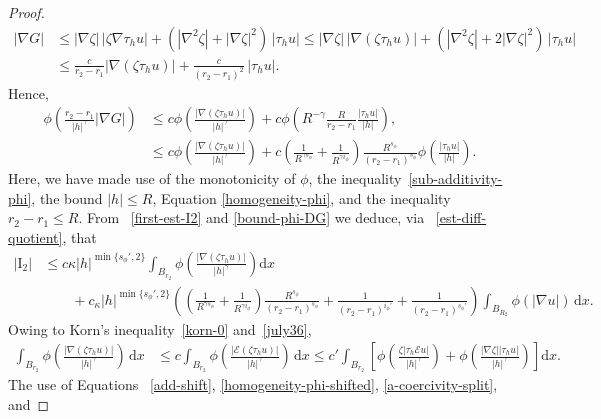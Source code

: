 \documentclass[leqno,11pt]{amsart}%
\numberwithin{equation}{section}
\def\d{\mathrm{d}}
\def\E{\mathcal{E}}
\def\dx{\d x}
\theoremstyle{definition}
\numberwithin{equation}{section}
\begin{document}
\begin{proof}
\begin{align*}
    |\nabla G|
    &\le
      |\nabla\zeta|\,|\zeta \nabla \tau_hu|
      +
      (|\nabla ^2\zeta|+|\nabla\zeta|^2)\,|\tau_hu|\le
      |\nabla\zeta|\,|\nabla(\zeta\tau_hu)|+(|\nabla^2\zeta|+2|\nabla\zeta|^2)\,|\tau_hu|\\
    &\le
    \frac{c}{r_2-r_1}|\nabla(\zeta\tau_hu)|+\frac{c}{(r_2-r_1)^2}\,|\tau_hu|.
\end{align*}
Hence, 
\begin{align}\label{bound-phi-DG}
    \phi\left(\frac{r_2-r_1}{|h|^\gamma}|\nabla G|\right)
    &\le
      c\phi\left(\frac{|\nabla(\zeta\tau_hu)|}{|h|^\gamma}\right)
      +
      c\phi\left( {R^{-\gamma}\frac{R}{r_2-r_1}}\frac{|\tau_hu|}{|h|}\right),\\\nonumber
    &\le
      c\phi\left(\frac{|\nabla (\zeta\tau_hu)|}{|h|^\gamma}\right)
      +
      {c\left(\frac{1}{R^{\gamma s_\phi}}+\frac{1}{R^{\gamma i_\phi}}\right)\frac{R^{s_\phi}}{(r_2-r_1)^{s_\phi}}}\phi\left(\frac{|\tau_hu|}{|h|}\right).
  \end{align}
  Here, we have made use of the monotonicity of $\phi$,
the inequality~\eqref{sub-additivity-phi},  the bound $|h|\le R$, Equation \eqref{homogeneity-phi}, and the inequality
  $r_2-r_1\le R $. From 
 ~\eqref{first-est-I2} and \eqref{bound-phi-DG} we deduce, 
 via ~\eqref{est-diff-quotient}, that
  \begin{align}\label{second-est-I2}
    |\mathrm{I}_2|
    &\le
      c\kappa |h|^{\min\{s_\phi',2\}}\int_{B_{r_2}}
      \phi\left(\frac{|\nabla (\zeta\tau_hu)|}{|h|^\gamma}\right) \dx\\\nonumber
    &\qquad
      +
      c_\kappa |h|^{\min\{s_\phi',2\}}\left( {\left(\frac{1}{R^{\gamma s_\phi}}+\frac{1}{R^{\gamma i_\phi}}\right)\frac{R^{s_\phi}}{(r_2-r_1)^{s_\phi}}}
      +
      \frac{1}{(r_2-r_1)^{i_\phi'}}
      +\frac{1}{(r_2-r_1)^{s_\phi'}}
    \right)\int_{B_{R_2}}\phi(|\nabla u|)
      \,\dx.
  \end{align}
Owing to Korn's
  inequality~\eqref{korn-0} 
  and~\eqref{july36}, 
  \begin{align}\label{bound-higher-deriv}
    \int_{B_{r_2}}
    \phi\left(\frac{|\nabla(\zeta\tau_hu)|}{|h|^\gamma}\right)\,\dx
    &\le
    c\int_{B_{r_2}}
      \phi\left(\frac{|\E(\zeta\tau_hu)|}{|h|^\gamma}\right)\,\dx\le
      c'\int_{B_{r_2}}
      \left[
      \phi\left(\frac{\zeta|\tau_h\E u|}{|h|^\gamma}\right)
      +
      \phi\left(\frac{|\nabla\zeta||\tau_hu|}{|h|^\gamma}\right)\right]\dx.
  \end{align}
  The use of Equations ~\eqref{add-shift}, \eqref{homogeneity-phi-shifted}, \eqref{a-coercivity-split}, and 

\end{proof}
\end{document}
